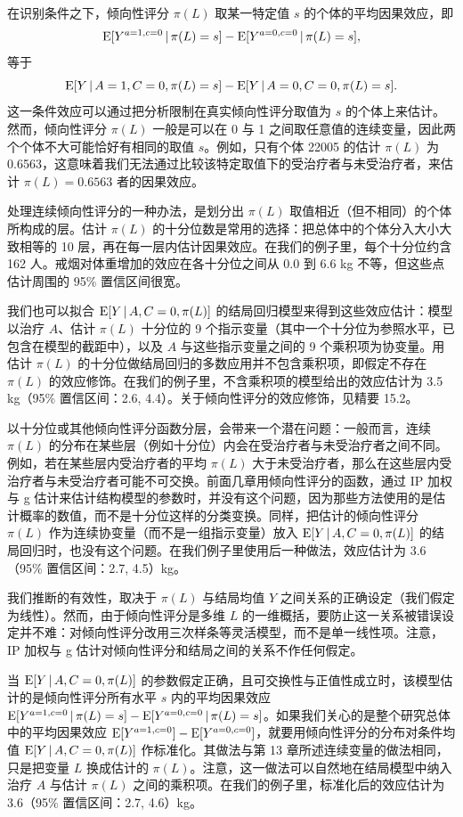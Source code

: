 在识别条件之下，倾向性评分 $\pi(L)$ 取某一特定值 $s$ 的个体的平均因果效应，即
\[
\mathrm{E}[Y^{a=1,c=0}\,|\,\pi(L)=s]-\mathrm{E}[Y^{a=0,c=0}\,|\,\pi(L)=s],
\]
等于
\[
\mathrm{E}[Y\,|\, A=1,C=0,\pi(L)=s]-\mathrm{E}[Y\,|\, A=0,C=0,\pi(L)=s].
\]
这一条件效应可以通过把分析限制在真实倾向性评分取值为 $s$ 的个体上来估计。然而，倾向性评分 $\pi(L)$ 一般是可以在 0 与 1 之间取任意值的连续变量，因此两个个体不大可能恰好有相同的取值 $s$。例如，只有个体 22005 的估计 $\pi(L)$ 为 0.6563，这意味着我们无法通过比较该特定取值下的受治疗者与未受治疗者，来估计 $\pi(L)=0.6563$ 者的因果效应。

处理连续倾向性评分的一种办法，是划分出 $\pi(L)$ 取值相近（但不相同）的个体所构成的层。估计 $\pi(L)$ 的十分位数是常用的选择：把总体中的个体分入大小大致相等的 10 层，再在每一层内估计因果效应。在我们的例子里，每个十分位约含 162 人。戒烟对体重增加的效应在各十分位之间从 0.0 到 6.6 kg 不等，但这些点估计周围的 95\% 置信区间很宽。

我们也可以拟合 $\mathrm{E}[Y\,|\, A,C=0,\pi(L)]$ 的结局回归模型来得到这些效应估计：模型以治疗 $A$、估计 $\pi(L)$ 十分位的 9 个指示变量（其中一个十分位为参照水平，已包含在模型的截距中），以及 $A$ 与这些指示变量之间的 9 个乘积项为协变量。用估计 $\pi(L)$ 的十分位做结局回归的多数应用并不包含乘积项，即假定不存在 $\pi(L)$ 的效应修饰。在我们的例子里，不含乘积项的模型给出的效应估计为 3.5 kg（95\% 置信区间：2.6, 4.4）。关于倾向性评分的效应修饰，见精要 15.2。

以十分位或其他倾向性评分函数分层，会带来一个潜在问题：一般而言，连续 $\pi(L)$ 的分布在某些层（例如十分位）内会在受治疗者与未受治疗者之间不同。例如，若在某些层内受治疗者的平均 $\pi(L)$ 大于未受治疗者，那么在这些层内受治疗者与未受治疗者可能不可交换。前面几章用倾向性评分的函数，通过 IP 加权与 g 估计来估计结构模型的参数时，并没有这个问题，因为那些方法使用的是估计概率的数值，而不是十分位这样的分类变换。同样，把估计的倾向性评分 $\pi(L)$ 作为连续协变量（而不是一组指示变量）放入 $\mathrm{E}[Y\,|\, A,C=0,\pi(L)]$ 的结局回归时，也没有这个问题。在我们例子里使用后一种做法，效应估计为 3.6（95\% 置信区间：2.7, 4.5）kg。

我们推断的有效性，取决于 $\pi(L)$ 与结局均值 $Y$ 之间关系的正确设定（我们假定为线性）。然而，由于倾向性评分是多维 $L$ 的一维概括，要防止这一关系被错误设定并不难：对倾向性评分改用三次样条等灵活模型，而不是单一线性项。注意，IP 加权与 g 估计对倾向性评分和结局之间的关系不作任何假定。

当 $\mathrm{E}[Y\,|\, A,C=0,\pi(L)]$ 的参数假定正确，且可交换性与正值性成立时，该模型估计的是倾向性评分所有水平 $s$ 内的平均因果效应 $\mathrm{E}[Y^{a=1,c=0}\,|\,\pi(L)=s]-\mathrm{E}[Y^{a=0,c=0}\,|\,\pi(L)=s]$。如果我们关心的是整个研究总体中的平均因果效应 $\mathrm{E}[Y^{a=1,c=0}]-\mathrm{E}[Y^{a=0,c=0}]$，就要用倾向性评分的分布对条件均值 $\mathrm{E}[Y\,|\, A,C=0,\pi(L)]$ 作标准化。其做法与第 13 章所述连续变量的做法相同，只是把变量 $L$ 换成估计的 $\pi(L)$。注意，这一做法可以自然地在结局模型中纳入治疗 $A$ 与估计 $\pi(L)$ 之间的乘积项。在我们的例子里，标准化后的效应估计为 3.6（95\% 置信区间：2.7, 4.6）kg。


